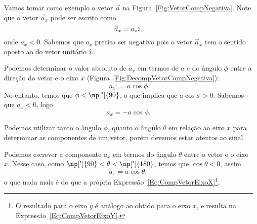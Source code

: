 Vamos tomar como exemplo o vetor $\vec{a}$ na Figura~\ref{Fig:VetorCompNegativa}. Note que o vetor $\vec{a}_x$ pode ser escrito como
\begin{equation}
    \vec{a}_x = a_x \hat{\imath},
\end{equation}
%
onde $a_x < 0$. Sabemos que $a_x$ precisa ser negativo pois o vetor $\vec{a}_x$ tem o sentido oposto ao do vetor unitário $\hat{\imath}$.

Podemos determinar o valor absoluto de $a_x$ em termos de $a$ e do ângulo $\phi$ entre a direção do vetor e o eixo $x$ (Figura~\ref{Fig:DecompVetorCompNegativa}):
\begin{equation}
    |a_x| = a \cos\phi.
\end{equation}
%
No entanto, temos que $\phi < \np[\tcdegree]{90}$, o que implica que $a \cos\phi > 0$. Sabemos que $a_x < 0$, logo
\begin{equation}
    a_x = - a \cos\phi.
\end{equation}

\begin{marginfigure}
\centering
{}
\caption{Podemos utilizar tanto o ângulo $\phi$, quanto o ângulo $\theta$ em relação ao eixo $x$ para determinar as componentes de um vetor, porém devemos estar atentos ao sinal. \label{Fig:DecompVetorCompNegativa}}
\end{marginfigure}

Podemos escrever a componente $a_x$ em termos do ângulo $\theta$ entre o vetor e o eixo $x$. Nesse caso, como $\np[\tcdegree]{90} < \theta < \np[\tcdegree]{180}$, temos que $\cos\theta < 0$, assim
\begin{equation}
    a_x = a\cos\theta,
\end{equation}
%
o que nada mais é do que a própria Expressão~\eqref{Eq:CompVetorEixoX}\footnote{O resultado para o eixo $y$ é análogo ao obtido para o eixo $x$, e resulta na Expressão~\eqref{Eq:CompVetorEixoY}.}.

